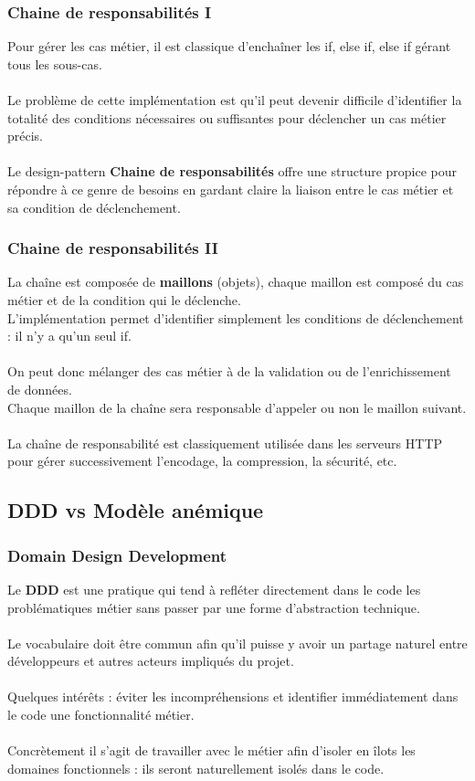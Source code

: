 \begin{frame}[fragile]
	\frametitle{Chaine de responsabilit\'{e}s I}
Pour g\'{e}rer les cas m\'{e}tier, il est classique d'encha\^{i}ner les if, else if, else if g\'{e}rant tous les sous-cas. 
\\~\\
Le probl\`{e}me de cette impl\'{e}mentation est qu'il peut devenir difficile d'identifier la totalit\'{e} des conditions n\'{e}cessaires ou suffisantes pour d\'{e}clencher un cas m\'{e}tier pr\'{e}cis.
\\~\\
Le design-pattern \textbf{Chaine de responsabilit\'{e}s} offre une structure propice pour r\'{e}pondre \`{a} ce genre de besoins en gardant claire la liaison entre le cas m\'{e}tier et sa condition de d\'{e}clenchement.
\end{frame}

\begin{frame}[fragile]
	\frametitle{Chaine de responsabilit\'{e}s II}
La cha\^{i}ne est compos\'{e}e de \textbf{maillons} (objets), chaque maillon est compos\'{e} du cas m\'{e}tier et de la condition qui le d\'{e}clenche.
\\
L'impl\'{e}mentation permet d'identifier simplement les conditions de d\'{e}clenchement : il n'y a qu'un seul if.
\\~\\
On peut donc m\'{e}langer des cas m\'{e}tier \`{a} de la validation ou de l'enrichissement de donn\'{e}es.
\\
Chaque maillon de la cha\^{i}ne sera responsable d'appeler ou non le maillon suivant.
\\~\\
La cha\^{i}ne de responsabilit\'{e} est classiquement utilis\'{e}e dans les serveurs HTTP pour g\'{e}rer successivement l'encodage, la compression, la s\'{e}curit\'{e}, etc.
\end{frame}

\subsection{DDD vs Mod\`{e}le an\'{e}mique}
\begin{frame}[fragile]
	\frametitle{Domain Design Development}
Le \textbf{DDD} est une pratique qui tend \`{a} refl\'{e}ter directement dans le code les probl\'{e}matiques m\'{e}tier sans passer par une forme d'abstraction technique.
\\~\\
Le vocabulaire doit \^{e}tre commun afin qu'il puisse y avoir un partage naturel entre d\'{e}veloppeurs et autres acteurs impliqu\'{e}s du projet.
\\~\\
Quelques int\'{e}r\^{e}ts : \'{e}viter les incompr\'{e}hensions et identifier imm\'{e}diatement dans le code une fonctionnalit\'{e} m\'{e}tier.
\\~\\
Concr\`{e}tement il s'agit de travailler avec le m\'{e}tier afin d'isoler en \^{i}lots les domaines fonctionnels : ils seront naturellement isol\'{e}s dans le code.
\end{frame}

